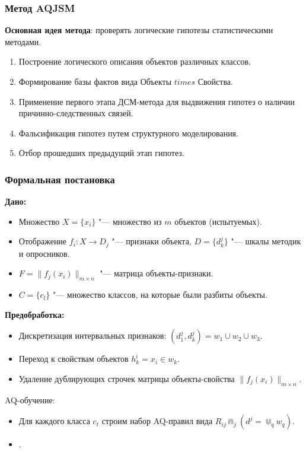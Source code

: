 \documentclass[default]{beamer}
\begin{document}
	\begin{frame}
		\frametitle{Метод AQJSM}
		\textbf{Основная идея метода}: проверять логические гипотезы статистическими методами.
		\begin{enumerate}
			\item Построение логического описания объектов различных классов.
			\item Формирование базы фактов вида Объекты $times$ Свойства.
			\item Применение первого этапа ДСМ-метода для выдвижения гипотез о наличии причинно-следственных связей.
			\item Фальсификация гипотез путем структурного моделирования.
			\item Отбор прошедших предыдущий этап гипотез.
		\end{enumerate}
	\end{frame}
	
	\begin{frame}
		\frametitle{Формальная постановка}
		\textbf{Дано:}
		\begin{itemize}
			\item Множество $X=\{x_i\}$ "--- множество из $m$ объектов (испытуемых).
			\item Отображение $f_i: X\rightarrow D_j$ "--- признаки объекта, $D=\{d_k^j\}$ "--- шкалы методик и опросников.
			\item $F=\|f_j(x_i)\|_{m\times n}$ "--- матрица объекты-признаки.
			\item $C=\{c_l\}$ "--- множество классов, на которые были разбиты объекты.
			\par\bigskip
		\end{itemize}
		\par\bigskip
		\textbf{Предобработка:}
		\begin{itemize}
			\item Дискретизация интервальных признаков: $(d_1^j,d^j_k)=w_1\cup w_2\cup w_3$.
			\item Переход к свойствам объектов $h^i_k=x_i\in w_k$.
			\item Удаление дублирующих строчек матрицы объекты-свойства $\|f_j(x_i)\|_{m\times n}$.
		\end{itemize}
		\par\bigskip
		AQ-обучение:
		\begin{itemize}
			\item Для каждого класса $c_t$ строим набор AQ-правил вида $R_{ij}\Cap_j\left(d^j=\Cup_q w_q\right)$.
			\item .
		\end{itemize}
	\end{frame}
\end{document}
